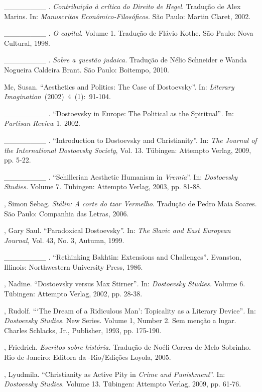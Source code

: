 \begin{Parskip}
\_\_\_\_\_\_\_\_ . \emph{Contribuição à crítica do Direito de Hegel}.
Tradução de Alex Marins. In: \emph{Manuscritos Econômico-Filosóficos}.
São Paulo: Martin Claret, 2002.

\_\_\_\_\_\_\_\_ . \emph{O capital}. Volume 1. Tradução de Flávio Kothe.
São Paulo: Nova Cultural, 1998.

\_\_\_\_\_\_\_\_ . \emph{Sobre a questão judaica.} Tradução de Nélio
Schneider e Wanda Nogueira Caldeira Brant. São Paulo: Boitempo, 2010.

Mc, Susan. ``Aesthetics and Politics: The Case of Dostoevsky''.
In: \emph{Literary Imagination}~(2002)~4~(1):~91-104.

\_\_\_\_\_\_\_\_ . ``Dostoevsky in Europe: The Political as the
Spiritual''\emph{.} In: \emph{Partisan Review} 1. 2002.

\_\_\_\_\_\_\_\_ . ``Introduction to Dostoevsky and Christianity''. In:
\emph{The Journal of the International Dostoevsky Society}, Vol. 13.
Tübingen: Attempto Verlag, 2009, pp. 5-22.

\_\_\_\_\_\_\_\_ . ``Schillerian Aesthetic Humanism in \emph{Vremia}''.
In: \emph{Dostoevsky Studies.} Volume 7. Tübingen: Attempto Verlag,
2003, pp. 81-88.

, Simon Sebag. \emph{Stálin: A corte do tzar Vermelho}.
Tradução de Pedro Maia Soares. São Paulo: Companhia das Letras, 2006.

, Gary Saul. ``Paradoxical Dostoevsky''. In: \emph{The Slavic and
East European Journal,} Vol. 43, No. 3, Autumn, 1999.

\_\_\_\_\_\_\_\_ . ``Rethinking Bakhtin: Extensions and
Challenges''\emph{.} Evanston, Illinois: Northwestern University Press,
1986.

, Nadine. ``Dostoevsky versus Max Stirner''\emph{.} In:
\emph{Dostoevsky Studies.} Volume 6. Tübingen: Attempto Verlag, 2002,
pp. 28-38.

, Rudolf. ```The Dream of a Ridiculous Man': Topicality as a
Literary Device''\emph{.} In: \emph{Dostoevsky Studies.} New Series.
Volume 1, Number 2. Sem menção a lugar. Charles Schlacks, Jr.,
Publisher, 1993, pp. 175-190.

, Friedrich. \emph{Escritos sobre história.} Tradução de Noéli
Correa de Melo Sobrinho. Rio de Janeiro: Editora da -Rio/Edições
Loyola, 2005.

, Lyudmila. ``Christianity as Active Pity in \emph{Crime and
Punishment}''. In: \emph{Dostoevsky Studies.} Volume 13. Tübingen:
Attempto Verlag, 2009, pp. 61-76.


\end{Parskip}
